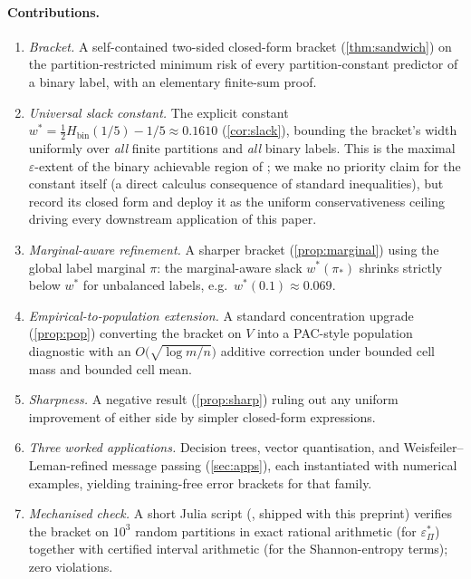 \documentclass[10pt]{article}
\theoremstyle{definition}
\theoremstyle{remark}
\newcommand{\Hbin}{H_{\mathrm{bin}}}
\newcommand{\eps}{\varepsilon}
\newcommand{\epsP}{\eps^{\!*}_{\Pi}}
\begin{document}
\paragraph{Contributions.}
\begin{enumerate}[(C1)]
  \item \emph{Bracket.} A self-contained two-sided closed-form
    bracket (\cref{thm:sandwich}) on the partition-restricted
    minimum risk of every partition-constant predictor of a
    binary label, with an elementary finite-sum proof.
  \item \emph{Universal slack constant.} The explicit constant
    $w^{*} = \tfrac{1}{2}\Hbin(1/5) - 1/5 \approx 0.1610$
    (\cref{cor:slack}), bounding the bracket's width uniformly
    over \emph{all} finite partitions and \emph{all} binary
    labels. This is the maximal $\eps$-extent of the binary
    achievable region of \citet{feder1994}; we make no priority
    claim for the constant itself (a direct calculus consequence
    of standard inequalities), but record its closed form and
    deploy it as the uniform conservativeness ceiling driving
    every downstream application of this paper.
  \item \emph{Marginal-aware refinement.} A sharper bracket
    (\cref{prop:marginal}) using the global label marginal
    $\pi$: the marginal-aware slack $w^{*}(\pi_{*})$ shrinks
    strictly below $w^{*}$ for unbalanced labels, e.g.\
    $w^{*}(0.1) \approx 0.069$.
  \item \emph{Empirical-to-population extension.} A standard
    concentration upgrade (\cref{prop:pop}) converting the
    bracket on $V$ into a PAC-style population diagnostic with
    an $O\bigl(\sqrt{\log m / n}\bigr)$ additive correction
    under bounded cell mass and bounded cell mean.
  \item \emph{Sharpness.} A negative result
    (\cref{prop:sharp}) ruling out any uniform improvement of
    either side by simpler closed-form expressions.
  \item \emph{Three worked applications.} Decision trees, vector
    quantisation, and Weisfeiler--Leman-refined message passing
    (\cref{sec:apps}), each instantiated with numerical examples,
    yielding training-free error brackets for that family.
  \item \emph{Mechanised check.} A short Julia script
    (, shipped with this preprint) verifies the
    bracket on $10^{3}$ random partitions in exact rational
    arithmetic (for $\epsP$) together with certified interval
    arithmetic (for the Shannon-entropy terms); zero violations.

\end{enumerate}
\end{document}
